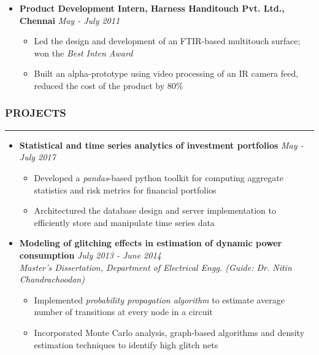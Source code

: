 \documentclass[10pt,a4paper,English]{article}
\newcommand\roottitle[1]{\vspace{-4mm}\subsubsection*{\uppercase{#1}}\vspace{-0.3em}\nopagebreak[4]\hrule\vspace{4mm}}
\newcommand\itemyear[1]{\hfill \emph{\color{itemyear} #1}}
\newcommand\itemenv{\setlength\itemsep{0.5pt} \addtolength{\itemindent}{-5mm}\vspace{-1.5mm}}
\begin{document}
\begin{itemize}
    \item \textbf{Product Development Intern, Harness Handitouch Pvt. Ltd., Chennai} \itemyear{May - July 2011}
        \begin{itemize} \itemenv
            \item Led the design and development of an FTIR-based multitouch surface; won the \textit{Best Inten Award}
            \item Built an alpha-prototype using video processing of an IR camera feed, reduced the cost of the product by 80\%
        \end{itemize}

    \end{itemize}

\roottitle{Projects}
\begin{itemize} \itemenv
    \item \textbf{Statistical and time series analytics of investment portfolios} \itemyear{May - July 2017}
        \begin{itemize} \itemenv
            \item Developed a \textit{pandas}-based python toolkit for computing aggregate statistics and risk metrics for financial portfolios
            \item Architectured the database design and server implementation to efficiently store and manipulate time series data
        \end{itemize}
    \item \textbf{Modeling of glitching effects in estimation of dynamic power consumption} \itemyear{July 2013 - June 2014} \\
    \emph{Master's Dissertation, Department of Electrical Engg. (Guide: Dr. Nitin Chandrachoodan)}
        \begin{itemize} \itemenv
            \item Implemented \textit{probability propagation algorithm} to estimate average number of transitions at every node in a circuit
            \item Incorporated Monte Carlo analysis, graph-based algorithms and density estimation techniques to identify high glitch nets
        \end{itemize}
\end{itemize}
\end{document}
